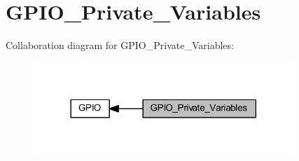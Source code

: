 \hypertarget{group___g_p_i_o___private___variables}{}\section{G\+P\+I\+O\+\_\+\+Private\+\_\+\+Variables}
\label{group___g_p_i_o___private___variables}
Collaboration diagram for G\+P\+I\+O\+\_\+\+Private\+\_\+\+Variables\+:
\nopagebreak
\begin{figure}[H]
\begin{center}
\leavevmode
\includegraphics[width=278pt]{group___g_p_i_o___private___variables}
\end{center}
\end{figure}
